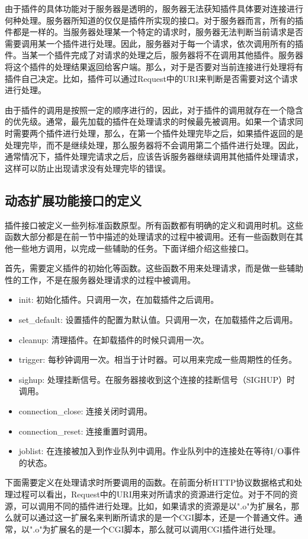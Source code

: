 \documentclass[12pt, twoside, a4paper, xetex]{report}
\begin{document}
	由于插件的具体功能对于服务器是透明的，服务器无法获知插件具体要对连接进行何种处理。服务器所知道的仅仅是插件所实现的接口。对于服务器而言，所有的插件都是一样的。当服务器处理某一个特定的请求时，服务器无法判断当前请求是否需要调用某一个插件进行处理。因此，服务器对于每一个请求，依次调用所有的插件。当某一个插件完成了对请求的处理之后，服务器将不在调用其他插件。服务器将这个插件的处理结果返回给客户端。那么，对于是否要对当前连接进行处理将有插件自己决定。比如，插件可以通过Request中的URI来判断是否需要对这个请求进行处理。
	
	由于插件的调用是按照一定的顺序进行的，因此，对于插件的调用就存在一个隐含的优先级。通常，最先加载的插件在处理请求的时候最先被调用。如果一个请求同时需要两个插件进行处理，那么，在第一个插件处理完毕之后，如果插件返回的是处理完毕，而不是继续处理，那么服务器将不会调用第二个插件进行处理。因此，通常情况下，插件处理完请求之后，应该告诉服务器继续调用其他插件处理请求，这样可以防止出现请求没有处理完毕的错误。
	
\subsection{动态扩展功能接口的定义}
	插件接口被定义一些列标准函数原型。所有函数都有明确的定义和调用时机。这些函数大部分都是在前一节中描述的处理请求的过程中被调用。还有一些函数则在其他一些地方调用，以完成一些辅助的任务。下面详细介绍这些接口。
	
	首先，需要定义插件的初始化等函数。这些函数不用来处理请求，而是做一些辅助性的工作，不是在服务器处理请求的过程中被调用。
	\begin{itemize}
		\item init: 初始化插件。只调用一次，在加载插件之后调用。
		\item set\_default: 设置插件的配置为默认值。只调用一次，在加载插件之后调用。
		\item cleanup: 清理插件。在卸载插件的时候只调用一次。
		\item trigger: 每秒钟调用一次。相当于计时器。可以用来完成一些周期性的任务。
		\item sighup: 处理挂断信号。在服务器接收到这个连接的挂断信号（SIGHUP）时调用。
		\item connection\_close: 连接关闭时调用。
		\item connection\_reset: 连接重置时调用。
		\item joblist: 在连接被加入到作业队列中调用。作业队列中的连接处在等待I/O事件的状态。
	\end{itemize}
	
	下面需要定义在处理请求时所要调用的函数。在前面分析HTTP协议数据格式和处理过程可以看出，Request中的URI用来对所请求的资源进行定位。对于不同的资源，可以调用不同的插件进行处理。比如，如果请求的资源是以".o"为扩展名，那么就可以通过这一扩展名来判断所请求的是一个CGI脚本，还是一个普通文件。通常，以".o"为扩展名的是一个CGI脚本，那么就可以调用CGI插件进行处理。
	
\end{document}
